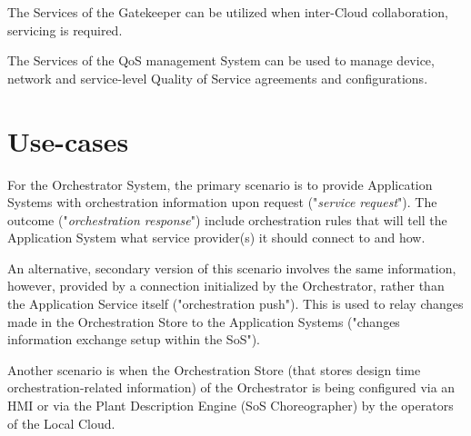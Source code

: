 \documentclass[a4paper]{arrowhead}
\begin{document}
The Services of the Gatekeeper can be utilized when inter-Cloud collaboration, servicing is required. 

The Services of the QoS management System can be used to manage device, network and service-level Quality of Service agreements and configurations. 


\section{Use-cases }
For the Orchestrator System, the primary scenario is to provide Application Systems with orchestration information upon request ("\emph{service request}"). The outcome ("\emph{orchestration response}") include orchestration rules that will tell the Application System what service provider(s) it should connect to and how.

An alternative, secondary version of this scenario involves the same information, however, provided by a connection initialized by the Orchestrator, rather than the Application Service itself ("orchestration push"). This is used to relay changes made in the Orchestration Store to the Application Systems ("changes information exchange setup within the SoS"). 

Another scenario is when the Orchestration Store (that stores design time orchestration-related information) of the Orchestrator is being configured via an HMI or via the Plant Description Engine (SoS Choreographer) by the operators of the Local Cloud. 
\end{document}
